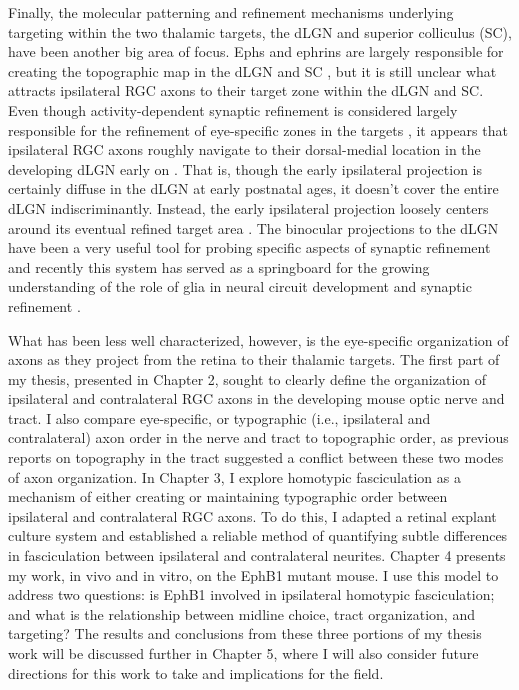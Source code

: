 Finally, the molecular patterning and refinement mechanisms underlying targeting within the two thalamic targets, the dLGN and superior colliculus (SC), have been another big area of focus.
Ephs and ephrins are largely responsible for creating the topographic map in the dLGN and SC \cite[reviewed in][]{erskine2014connecting,feldheim2010visual}, but it is still unclear what attracts ipsilateral RGC axons to their target zone within the dLGN and SC.
Even though activity-dependent synaptic refinement is considered largely responsible for the refinement of eye-specific zones in the targets \cite[reviewed in][]{feller2009retinal}, it appears that ipsilateral RGC axons roughly navigate to their dorsal-medial location in the developing dLGN early on \cite{jaubert2005structural}.
That is, though the early ipsilateral projection is certainly diffuse in the dLGN at early postnatal ages, it doesn't cover the entire dLGN indiscriminantly.
Instead, the early ipsilateral projection loosely centers around its eventual refined target area \cite{jaubert2005structural}.
The binocular projections to the dLGN have been a very useful tool for probing specific aspects of synaptic refinement and recently this system has served as a springboard for the growing understanding of the role of glia in neural circuit development and synaptic refinement \cite[e.g.][]{chung2013astrocytes,schafer2012microglia}.

What has been less well characterized, however, is the eye-specific organization of axons as they project from the retina to their thalamic targets.
The first part of my thesis, presented in Chapter 2, sought to clearly define the organization of ipsilateral and contralateral RGC axons in the developing mouse optic nerve and tract.
I also compare eye-specific, or typographic (i.e., ipsilateral and contralateral) axon order in the nerve and tract to topographic order, as previous reports on topography in the tract suggested a conflict between these two modes of axon organization.
In Chapter 3, I explore homotypic fasciculation as a mechanism of either creating or maintaining typographic order between ipsilateral and contralateral RGC axons.
To do this, I adapted a retinal explant culture system and established a reliable method of quantifying subtle differences in fasciculation between ipsilateral and contralateral neurites.
Chapter 4 presents my work, in vivo and in vitro, on the EphB1 mutant mouse.
I use this model to address two questions: is EphB1 involved in ipsilateral homotypic fasciculation; and what is the relationship between midline choice, tract organization, and targeting?
The results and conclusions from these three portions of my thesis work will be discussed further in Chapter 5, where I will also consider future directions for this work to take and implications for the field.

